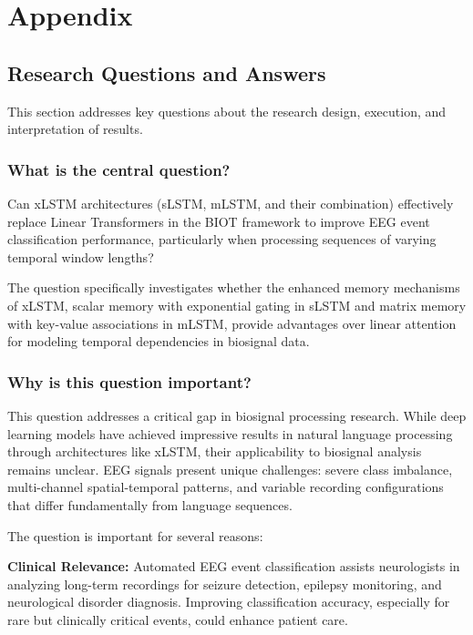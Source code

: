 
\cleardoubleoddpage%
\chapter{Appendix}
\label{app:appendix}

\section{Research Questions and Answers}

This section addresses key questions about the research design, execution, and interpretation of results.

\subsection{What is the central question?}

Can \ac{xLSTM} architectures (\ac{sLSTM}, \ac{mLSTM}, and their combination) effectively replace Linear Transformers in the \ac{BIOT} framework to improve \ac{EEG} event classification performance, particularly when processing sequences of varying temporal window lengths?

The question specifically investigates whether the enhanced memory mechanisms of \ac{xLSTM}, scalar memory with exponential gating in \ac{sLSTM} and matrix memory with key-value associations in \ac{mLSTM}, provide advantages over linear attention for modeling temporal dependencies in biosignal data.

\subsection{Why is this question important?}

This question addresses a critical gap in biosignal processing research. While deep learning models have achieved impressive results in natural language processing through architectures like \ac{xLSTM}, their applicability to biosignal analysis remains unclear. \ac{EEG} signals present unique challenges: severe class imbalance, multi-channel spatial-temporal patterns, and variable recording configurations that differ fundamentally from language sequences.

The question is important for several reasons:

\textbf{Clinical Relevance:} Automated \ac{EEG} event classification assists neurologists in analyzing long-term recordings for seizure detection, epilepsy monitoring, and neurological disorder diagnosis. Improving classification accuracy, especially for rare but clinically critical events, could enhance patient care.

